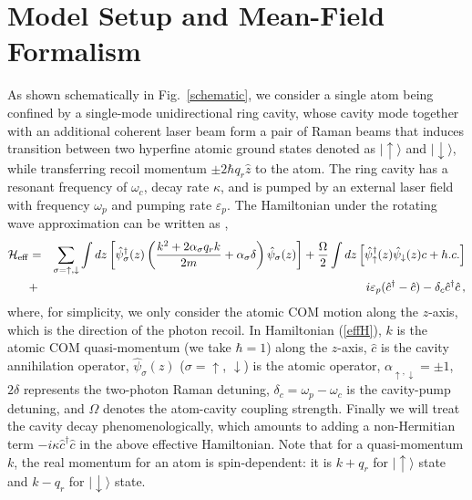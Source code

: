 \documentclass[atoms,article,submit,moreauthors,pdftex,12pt,a4paper]{mdpi}
\def\ba{\begin{eqnarray}}
\def\ea{\end{eqnarray}}
\begin{document}
\section{Model Setup and Mean-Field Formalism} \label{meanfield}

As shown schematically in Fig.~\ref{schematic}, we consider a single atom being confined by a single-mode unidirectional ring cavity, whose cavity mode together with an additional coherent laser beam form a pair of Raman beams that induces transition between two hyperfine atomic ground states denoted as $|\uparrow\rangle$ and $|\downarrow\rangle$, while transferring recoil momentum $\pm 2\hbar q_r\hat{z}$ to the atom. The ring cavity has a resonant frequency of $\omega_c$, decay rate $\kappa$, and is pumped by an external laser field with frequency $\omega_p$ and pumping rate $\varepsilon_p$. 
The Hamiltonian under the rotating wave approximation can be written as \cite{cavitySOC}, 
\ba
 \mathcal{H}_{\rm eff}& = & \sum_{\sigma=\uparrow,\downarrow} \int d{z}\left[ \hat{\psi}^\dagger_\sigma({z})\left(\frac{ { k}^2+ 2\alpha_\sigma q_r {k}}{2m}+\alpha_\sigma \delta\right)\hat{\psi}_\sigma(z)\right]+  \frac{\Omega}{2}\int d{z}\left[\hat{\psi}_{\uparrow}^{\dagger}({z})\hat{\psi}_{\downarrow}({z})c+ h.c. \right]\nonumber \\
 & + & i\varepsilon_{p}(\hat{c}^{\dagger}-\hat{c})-\delta_c \hat{c}^{\dagger}\hat{c} \,, \label{effH}
 \ea
where, for simplicity, we only consider the atomic COM motion along the $z$-axis, which is the direction of the photon recoil. In Hamiltonian (\ref{effH}), $k$ is the atomic COM quasi-momentum (we take $\hbar =1$) along the $z$-axis, $\hat{c}$ is the cavity annihilation operator, $\hat{\psi}_\sigma(z)$ ($\sigma = \uparrow$, $\downarrow$) is the atomic operator, $\alpha_{\uparrow, \downarrow}=\pm 1$, $2\delta$ represents the two-photon Raman detuning, $\delta_c=\omega_p-\omega_c$ is the cavity-pump detuning, and $\Omega$ denotes the atom-cavity coupling strength. Finally we will treat the cavity decay phenomenologically, which amounts to adding a non-Hermitian term $-i\kappa \hat{c}^{\dagger}\hat{c}$ in the above effective Hamiltonian. Note that for a quasi-momentum $k$, the real momentum for an atom is spin-dependent: it is $k+q_r$ for $|\uparrow \rangle$ state and $k-q_r$ for $|\downarrow \rangle$ state.
\end{document}
